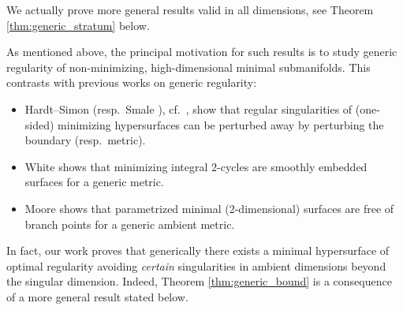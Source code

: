 \documentclass[12pt,twoside]{amsart}
\numberwithin{equation}{section}
\begin{document}
 We actually prove more general results valid in all dimensions, see Theorem \ref{thm:generic_stratum} below. 
  
  As mentioned above, the principal motivation for such results is to study generic regularity of non-minimizing, high-dimensional minimal submanifolds. This contrasts with previous works on generic regularity:
\begin{itemize}
    \item Hardt--Simon \cite{HS} (resp.\ Smale \cite{Smale}), cf.\ \cite{Liu}, show that regular singularities of (one-sided) minimizing hypersurfaces can be perturbed away by perturbing the boundary (resp.\ metric). 
    \item White \cite{White:85,white2019generic} shows that minimizing integral 2-cycles are smoothly embedded surfaces for a generic metric.  
    \item Moore \cite{Moore,Moore:book} shows that parametrized minimal (2-dimensional) surfaces are free of branch points for a generic ambient metric. 
\end{itemize}

  
 \medskip

In fact, our work proves that generically there exists a minimal hypersurface of optimal regularity avoiding \emph{certain} singularities in ambient dimensions beyond the singular dimension. Indeed, Theorem \ref{thm:generic_bound} is a consequence of a more general result stated below.
\end{document}

